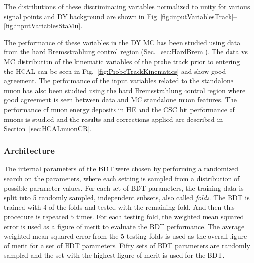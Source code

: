 The distributions of these discriminating variables normalized to unity for various signal points and DY background are shown in Fig~\ref{fig:inputVariablesTrack}--\ref{fig:inputVariablesStaMu}.

The performance of these variables in the DY MC has been studied using data from the hard Bremsstrahlung control region (Sec.~\ref{sec:HardBrem}).
The data vs MC distribution of the kinematic variables of the probe track prior to entering the HCAL can be seen in Fig.~\ref{fig:ProbeTrackKinematics} and show good agreement.
The performance of the input variables related to the standalone muon has also been studied using the hard Bremsstrahlung control region where good agreement is seen between data and MC standalone muon features.
The performance of muon energy deposits in HE and the CSC hit performance of muons is studied and the results and corrections applied are described in Section~\ref{sec:HCALmuonCR}.

\subsubsection*{Architecture}

The internal parameters of the BDT were chosen by performing a randomized search on the parameters, where each setting is sampled from a distribution of possible parameter values.
For each set of BDT parameters, the training data is split into 5 randomly sampled, independent subsets, also called \emph{folds}.
The BDT is trained with 4 of the folds and tested with the remaining fold. And then this procedure is repeated 5 times.
For each testing fold, the weighted mean squared error is used as a figure of merit to evaluate the BDT performance.
The average weighted mean squared error from the 5 testing folds is used as the overall figure of merit for a set of BDT parameters.
Fifty sets of BDT parameters are randomly sampled and the set with the highest figure of merit is used for the BDT.

